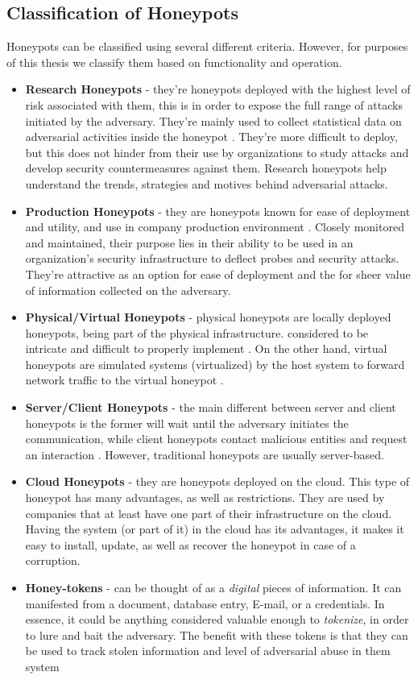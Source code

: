 \documentclass[grad,lot,lof,11pt,oneside,onehalfspace]{RUthesis}
\begin{document}
\subsection{Classification of Honeypots}
Honeypots can be classified using several different criteria. However, for purposes of this thesis we classify them based on functionality and operation. 
\begin{itemize}
\item {\textbf{Research Honeypots} -}
they're honeypots deployed with the highest level of risk associated with them, this is in order to expose the full range of attacks initiated by the adversary. They're mainly used to collect statistical data on adversarial activities inside the honeypot \cite{lihet_how_2015}. They're more difficult to deploy, but this does not hinder from their use by organizations to study attacks and develop security countermeasures against them. Research honeypots help understand the trends, strategies and motives behind adversarial attacks\cite{nawrocki_survey_2016}.
\item {\textbf{Production Honeypots} -}
they are honeypots known for ease of deployment and utility, and use in company production environment \cite{nawrocki_survey_2016}. Closely monitored and maintained, their purpose lies in their ability to be used in an organization's security infrastructure to deflect probes and security attacks. They're attractive as an option for ease of deployment and the for sheer value of information collected on the adversary. 
\item {\textbf{Physical/Virtual Honeypots} -} 
physical honeypots are locally deployed honeypots, being part of the physical infrastructure. considered to be intricate and difficult to properly implement \cite{lihet_how_2015}. On the other hand, virtual honeypots are simulated systems (virtualized) by the host system to forward network traffic to the virtual honeypot \cite{nawrocki_survey_2016}.
\item {\textbf{Server/Client Honeypots} -} 
the main different between server and client honeypots is the former will wait until the adversary initiates the communication, while client honeypots contact malicious entities and request an interaction \cite{nawrocki_survey_2016}. However, traditional honeypots are usually server-based. 
\item {\textbf{Cloud Honeypots} -}
they are honeypots deployed on the cloud. This type of honeypot has many advantages, as well as restrictions. They are used by companies that at least have one part of their infrastructure on the cloud. Having the system (or part of it) in the cloud has its advantages, it makes it easy to install, update, as well as recover the honeypot in case of a corruption\cite{lihet_how_2015}.
\item {\textbf{Honey-tokens} -}
can be thought of as a \textit{digital} pieces of information. It can manifested from a document, database entry, E-mail, or a credentials. In essence, it could be anything considered valuable enough to \textit{tokenize}, in order to lure and bait the adversary. The benefit with these tokens is that they can be used to track stolen information and level of adversarial abuse in them system \cite{akiyama_honeycirculator:_2018} 
\end{itemize}
\end{document}
